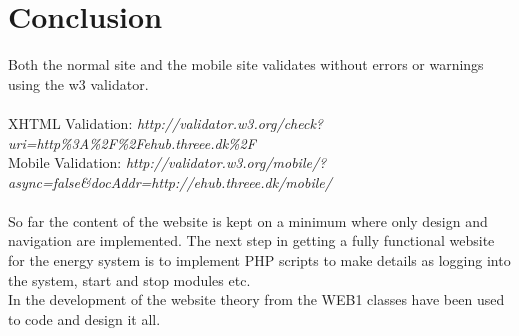 \chapter{Conclusion}
Both the normal site and the mobile site validates without errors or warnings using the w3 validator. 
\\\\XHTML Validation: \textit{http://validator.w3.org/check?uri=http\%3A\%2F\%2Fehub.threee.dk\%2F}
\\Mobile Validation: \textit{http://validator.w3.org/mobile/?async=false\&docAddr=http://ehub.threee.dk/mobile/}
\\\\So far the content of the website is kept on a minimum where only design and navigation are implemented. The next step in getting a fully functional website for the energy system is to implement PHP scripts to make details as logging into the system, start and stop modules etc.
\\In the development of the website theory from the WEB1 classes have been used to code and design it all.
